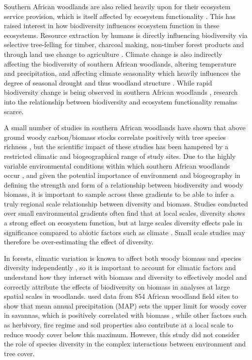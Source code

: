 \documentclass[11pt,a4paper]{article}
\begin{document}
Southern African woodlands are also relied heavily upon for their ecosystem service provision, which is itself affected by ecosystem functionality \citep{Schulze1994}. This has raised interest in how biodiversity influences ecosystem function in these ecosystems. Resource extraction by humans is directly influencing biodiversity via selective tree-felling for timber, charcoal making, non-timber forest products and through land use change to agriculture \citep{Aleman2016, Ryan2016}. Climate change is also indirectly affecting the biodiversity of southern African woodlands, altering temperature and precipitation, and affecting climate seasonality which heavily influences the degree of seasonal drought and thus woodland structure \citep{Scholes2004, Eldridge2012}. While rapid biodiversity change is being observed in southern African woodlands \citep{}, research into the relationship between biodiversity and ecosystem functionality remains scarce.

A small number of studies in southern African woodlands have shown that above ground woody carbon/biomass stocks correlate positively with tree species richness \citep{McNicol2018, Shirima2015, Mutowo2012}, but the scientific impact of these studies has been hampered by a restricted climatic and biogeographical range of study sites. Due to the highly variable environmental conditions within which southern African woodlands occur \citep{Frost1996}, and given the potential importance of environment and biogeography in defining the strength and form of a relationship between biodiversity and woody biomass, it is important to sample across these gradients to be able to infer a truly regional scale relationship between diversity and biomass. Studies conducted over small environmental gradients often find that at local scales, diversity shows a strong effect on ecosystem function, but at large scales diversity effects pale in significance compared to abiotic factors such as climate \citep{Pasari2013}. Small scale studies may therefore be over-estimating the effect of diversity.

In forests, climatic variation is known to affect both woody biomass \citep{Michaletz2014, Michaletz2018} and species diversity independently \citep{Spasojevic2014}, so it is important to account for climatic factors and understand how they interact with biomass and diversity to effectively model and correctly attribute the effects of biodiversity on biomass in analyses at large spatial scales in woodlands. \citet{Sankaran2005} used data from 854 African woodland field sites to show that mean annual precipitation (MAP) sets the upper limit for woody cover in savannas, which is positively correlated with biomass \citep{Chisholm2013, Prado-Junior2016}, while other factors such as herbivory, fire regime and soil properties also contribute at a local scale to reduce woody cover below this maximum. However, this study did not consider the role of species diversity in the complex interactions between environment and tree cover. 
\end{document}
